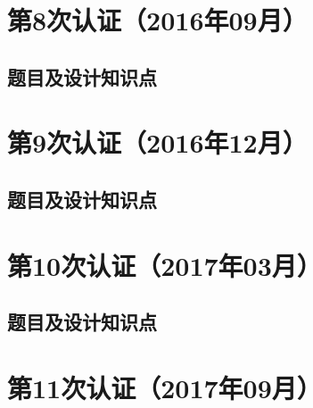 \documentclass[cn,10pt,math=newtx,citestyle=gb7714-2015,bibstyle=gb7714-2015]{elegantbook}
\begin{document}


\chapter{第8次认证（2016年09月）}

\section{题目及设计知识点}











\chapter{第9次认证（2016年12月）}

\section{题目及设计知识点}











\chapter{第10次认证（2017年03月）}

\section{题目及设计知识点}











\chapter{第11次认证（2017年09月）}
\end{document}
